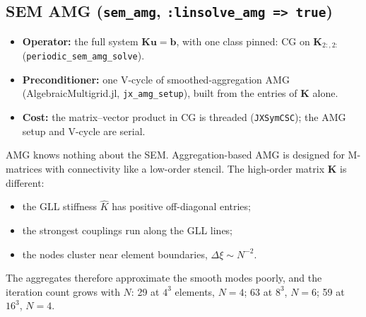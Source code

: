 \documentclass[11pt]{article}
\newcommand{\K}{\mathbf{K}}
\newcommand{\uu}{\mathbf{u}}
\newcommand{\bb}{\mathbf{b}}
\newcommand{\Khat}{\widehat{K}}
\newcommand{\code}[1]{\texttt{#1}}
\begin{document}
\subsection{SEM AMG (\code{sem\_amg}, \code{:linsolve\_amg => true})}
\begin{itemize}
  \item \textbf{Operator:} the full system $\K\uu=\bb$, with one class pinned: CG on $\K_{2:,2:}$ (\code{periodic\_sem\_amg\_solve}).
  \item \textbf{Preconditioner:} one V-cycle of smoothed-aggregation AMG (AlgebraicMultigrid.jl,
        \code{jx\_amg\_setup}), built from the entries of $\K$ alone.
  \item \textbf{Cost:} the matrix--vector product in CG is threaded (\code{JXSymCSC}); the AMG setup and
        V-cycle are serial.
\end{itemize}
AMG knows nothing about the SEM. Aggregation-based AMG is designed for M-matrices with
connectivity like a low-order stencil. The high-order matrix $\K$ is different:
\begin{itemize}
  \item the GLL stiffness $\Khat$ has positive off-diagonal entries;
  \item the strongest couplings run along the GLL lines;
  \item the nodes cluster near element boundaries, $\Delta\xi\sim N^{-2}$.
\end{itemize}
The aggregates therefore approximate the smooth modes poorly, and the iteration count grows with
$N$: 29 at $4^3$ elements, $N=4$; 63 at $8^3$, $N=6$; 59 at $16^3$, $N=4$.
\end{document}

